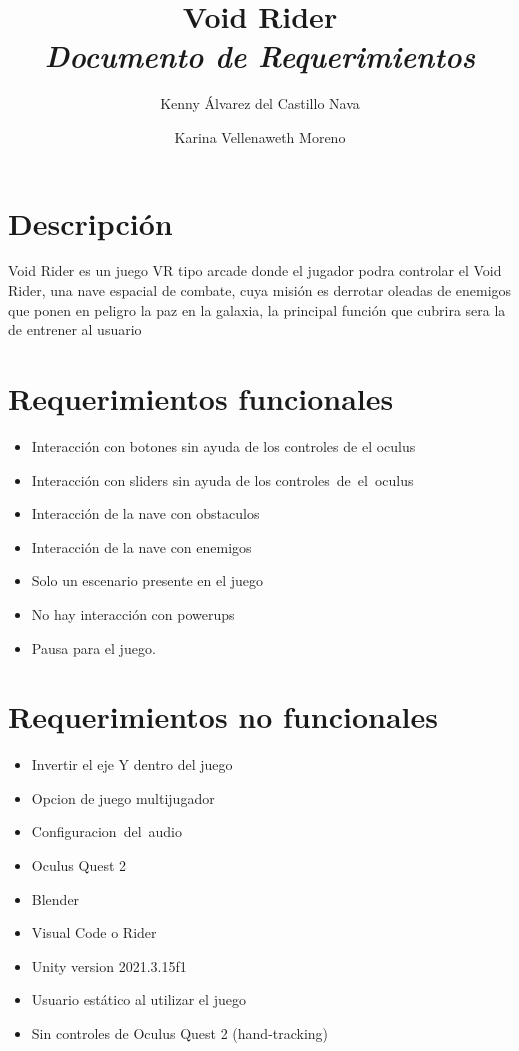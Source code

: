 \documentclass[12pt]{article} %
\title{Void Rider\\\emph{Documento de Requerimientos}}
\author{Kenny Álvarez del Castillo Nava \and Karina Vellenaweth Moreno}
\begin{document}
 \renewcommand{\familydefault}{\sfdefault}
\pagestyle{fancy}


\maketitle

\newpage

\tableofcontents

\newpage

\section{Descripción}\label{descripcion}
\par Void Rider es un juego VR tipo arcade donde el jugador podra controlar el Void Rider, una nave espacial de combate, cuya misión es derrotar oleadas de enemigos que ponen en peligro la paz en la galaxia, la principal función que cubrira sera la de entrener al usuario

\section{Requerimientos funcionales}\label{funcionales}
\begin{itemize}
  \item Interacción con botones sin ayuda de los controles de el oculus
  \item Interacción con sliders sin ayuda de los controles de el oculus
  \item  Interacción de la nave con obstaculos
  \item  Interacción de la nave con enemigos
  \item  Solo un escenario presente en el juego
  \item  No hay interacción con powerups
  \item Pausa para el juego.

\end{itemize}

\section{Requerimientos no funcionales}\label{no funcionales}
\begin{itemize}
  \item Invertir el eje Y dentro del juego
  \item Opcion de juego multijugador
  \item Configuracion del audio
 \item Oculus Quest 2
 \item Blender
 \item Visual Code o Rider
 \item Unity version 2021.3.15f1
 \item Usuario estático al utilizar el juego
\item  Sin controles de Oculus Quest 2 (hand-tracking)
\end{itemize}
\end{document}
